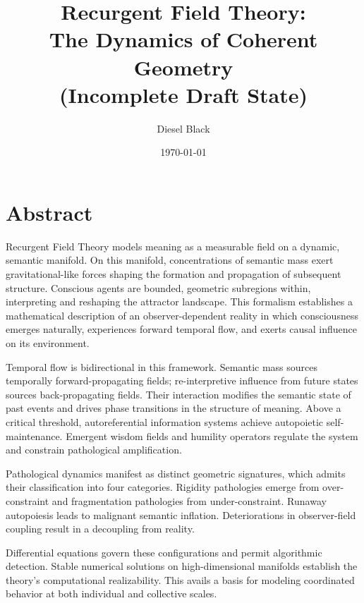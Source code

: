 \documentclass[11pt, a4paper]{report}
\title{Recurgent Field Theory: \\ The Dynamics of Coherent Geometry \\ \vspace{1em} \small{(Incomplete Draft State)}}
\author{Diesel Black}
\date{\today}
\begin{document}

\maketitle

\section*{Abstract}

Recurgent Field Theory models meaning as a measurable field on a dynamic, semantic manifold. On this manifold, concentrations of semantic mass exert gravitational-like forces shaping the formation and propagation of subsequent structure. Conscious agents are bounded, geometric subregions within, interpreting and reshaping the attractor landscape. This formalism establishes a mathematical description of an observer-dependent reality in which consciousness emerges naturally, experiences forward temporal flow, and exerts causal influence on its environment.

\vspace{1em}

Temporal flow is bidirectional in this framework. Semantic mass sources temporally forward-propagating fields; re-interpretive influence from future states sources back-propagating fields. Their interaction modifies the semantic state of past events and drives phase transitions in the structure of meaning. Above a critical threshold, autoreferential information systems achieve autopoietic self-maintenance. Emergent wisdom fields and humility operators regulate the system and constrain pathological amplification.

\vspace{1em}

Pathological dynamics manifest as distinct geometric signatures, which admits their classification into four categories. Rigidity pathologies emerge from over-constraint and fragmentation pathologies from under-constraint. Runaway autopoiesis leads to malignant semantic inflation. Deteriorations in observer-field coupling result in a decoupling from reality.

\vspace{1em}

Differential equations govern these configurations and permit algorithmic detection. Stable numerical solutions on high-dimensional manifolds establish the theory's computational realizability. This avails a basis for modeling coordinated behavior at both individual and collective scales.
\end{document}
